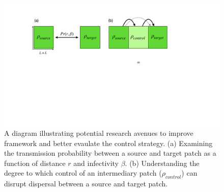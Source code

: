





\begin{figure}
    \centering
    \includegraphics[scale=0.35]{chapter7/figures/figure5-future-reserach.pdf}
    \caption{A diagram illustrating potential research avenues to improve framework and better evaulate the control strategy. 
    (a) Examining the transmission probability between a source and target patch as a function of distance $r$ and infectivity $\beta$. 
    (b) Understanding the degree to which control of an intermediary patch ($\rho_{control}$) can disrupt dispersal between a source and target patch.}
    \label{fig:future-research}
\end{figure}

